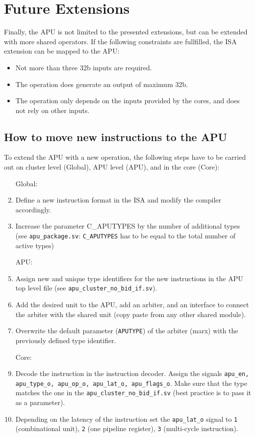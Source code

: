 \documentclass[%
 oneside,      %
 openany,      %
 halfparskip,  %
]{scrbook}
\begin{document}



\chapter{Future Extensions}\label{ch:future}

Finally, the APU is not limited to the presented extensions, but can be extended with more shared operators. If the following constraints are fullfilled, the ISA extension can be mapped to the APU:
\begin{itemize}
\item Not more than three 32b inputs are required.
\item The operation does generate an output of maximum 32b.
\item The operation only depends on the inputs provided by the cores, and does not rely on other inputs.
\end{itemize}

\section{How to move new instructions to the APU}

To extend the APU with a new operation, the following steps have to be carried out on cluster level (Global), APU level (APU), and in the core (Core):

\begin{enumerate}
\item [Global:]
\item Define a new instruction format in the ISA and modify the compiler accordingly.
\item Increase the parameter C\_APUTYPES by the number of additional types (see \texttt{apu\_package.sv}:  \texttt{C\_APUTYPES} has to be equal to the total number of active types)
\item [APU:]
\item Assign new and unique type identifiers for the new instructions in the APU top level file (see \texttt{apu\_cluster\_no\_bid\_if.sv}).
\item Add the desired unit to the APU, add an arbiter, and an interface to connect the arbiter with the shared unit (copy paste from any other shared module).
\item Overwrite the default parameter (\texttt{APUTYPE}) of the arbiter (marx) with the previously defined type identifier.
\item [Core:]
\item Decode the instruction in the instruction decoder. Assign the signals \texttt{apu\_en, apu\_type\_o, apu\_op\_o, apu\_lat\_o, apu\_flags\_o}. Make sure that the type matches the one in the \texttt{apu\_cluster\_no\_bid\_if.sv} (best practice is to pass it as a parameter).
\item Depending on the latency of the instruction set the \texttt{apu\_lat\_o} signal to \texttt{1} (combinational unit), \texttt{2} (one pipeline register), \texttt{3} (multi-cycle instruction).
\end{enumerate}
\end{document}
